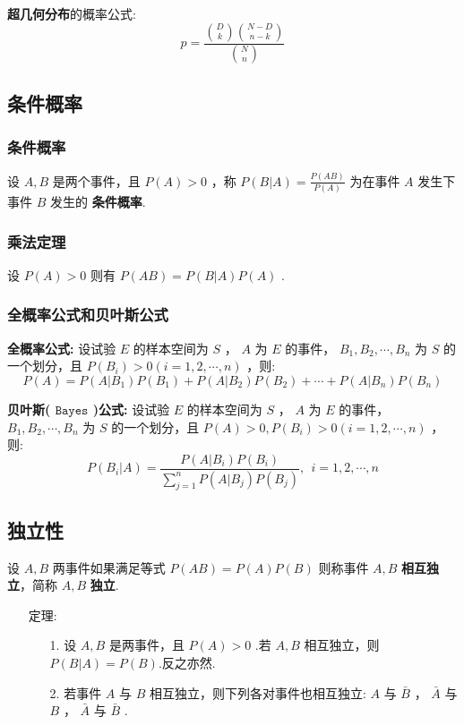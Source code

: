 \documentclass[UTF8]{ctexart}
\begin{document}
	{ \textbf{超几何分布}的概率公式: $$ p= \frac{ \binom{D}{k} \binom{N-D}{n-k} }{ \binom{N}{n} } $$ }
	
	\subsection{条件概率}
	
	\subsubsection{条件概率}
	
	{设 $ A,B $ 是两个事件，且 $ P(A)>0 $ ，称 $ P(B|A)= \frac{P(AB)}{P(A)} $ 为在事件 $ A $ 发生下事件 $ B $ 发生的 \textbf{条件概率}.}
	
	\subsubsection{乘法定理}
	
	{设 $ P(A)>0 $ 则有 $ P(AB)=P(B|A)P(A) $ .}
	
	\subsubsection{全概率公式和贝叶斯公式}
	
	{\textbf{全概率公式:} 设试验 $ E $ 的样本空间为 $ S $ ， $ A $ 为 $ E $ 的事件， $ B_{1},B_{2}, \cdots ,B_{n} $ 为 $ S $ 的一个划分，且 $ P(B_{i})>0(i=1,2, \cdots ,n) $ ，则: $$ P(A)=P(A|B_{1})P(B_{1})+P(A|B_{2})P(B_{2})+ \cdots +P(A|B_{n})P(B_{n}) $$ }
	
	{\textbf{贝叶斯( $ \texttt{Bayes} $ )公式:} 设试验 $ E $ 的样本空间为 $ S $ ， $ A $ 为 $ E $ 的事件， $ B_{1},B_{2}, \cdots ,B_{n} $ 为 $ S $ 的一个划分，且 $ P(A)>0,P(B_{i})>0(i=1,2, \cdots ,n) $ ，则: $$ P(B_{i}|A)= \frac{P(A|B_{i})P(B_{i})}{\sum\limits_{j=1}^{n}P(A|B_{j})P(B_{j})},\ \ i=1,2, \cdots ,n $$ }
	
	\subsection{独立性}
	
	{设 $ A,B $ 两事件如果满足等式 $ P(AB)=P(A)P(B) $ 则称事件 $ A,B $ \textbf{相互独立}，简称 $ A,B $ \textbf{独立}.}
	
	\begin{itemize}
		\item [定理:] {
			\begin{enumerate}
				\item [1.] {设 $ A,B $ 是两事件，且 $ P(A)>0 $ .若 $ A,B $ 相互独立，则 $ P(B|A)=P(B) $.反之亦然.}
				\item [2.] {若事件 $ A $ 与 $ B $ 相互独立，则下列各对事件也相互独立: $ A $ 与 $ \bar{B} $ ， $ \bar{A} $ 与 $ B $ ， $ \bar{A} $ 与 $ \bar{B} $ .}
			\end{enumerate}
		}
	\end{itemize}
	
\end{document}
